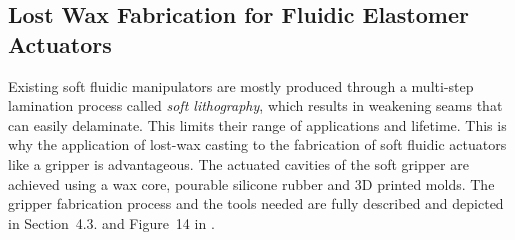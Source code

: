 \subsection{Lost Wax Fabrication for Fluidic Elastomer Actuators}
Existing soft fluidic manipulators are mostly produced through a multi-step lamination process called \emph{soft lithography}, which results in weakening seams that can easily delaminate. 
This limits their range of applications and lifetime.
This is why the application of lost-wax casting to the fabrication of soft fluidic actuators like a gripper is advantageous.
The actuated cavities of the soft gripper are achieved using a wax core, pourable silicone rubber and 3D printed molds.
The gripper fabrication process and the tools needed are fully described and depicted in Section~4.3. and Figure~14 in \cite{marchese2015recipe}. %
%
